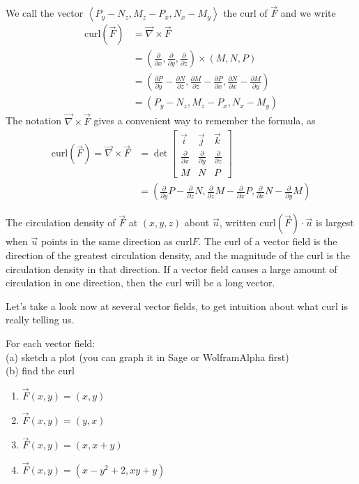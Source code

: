 We call the vector $\left<P_y-N_z,M_z-P_x,N_x-M_y\right>$ the curl of $\vec F$ and we write 
\begin{align*}
\text{curl}(\vec F) 
&= \vec \nabla \times \vec F \\
&= \left(\frac{\partial}{\partial x},\frac{\partial}{\partial y},\frac{\partial}{\partial z}\right) \times (M,N,P) \\
&= \left(\frac{\partial P}{\partial y}-\frac{\partial N}{\partial z}, \frac{\partial M}{\partial z}-\frac{\partial P}{\partial x},\frac{\partial N}{\partial x}-\frac{\partial M}{\partial y}\right) \\
&=  \left(P_y-N_z,M_z-P_x,N_x-M_y\right) 
\end{align*}
  The notation $\vec \nabla \times \vec F $ gives a convenient way to remember the formula, as 
\begin{align*}
\text{curl}(\vec F)=\vec \nabla \times \vec F 
&=\det \begin{bmatrix}
\vec i & \vec j & \vec k\\
\frac{\partial}{\partial x}&\frac{\partial}{\partial y}&\frac{\partial}{\partial z}\\
M&N&P
\end{bmatrix} 
\\&= \left(\frac{\partial}{\partial y}P-\frac{\partial}{\partial z}N,\frac{\partial}{\partial z}M-\frac{\partial}{\partial x}P,\frac{\partial}{\partial x}N-\frac{\partial}{\partial y}M\right)
\end{align*}
\begin{theorem}
The circulation density of $\vec F$ at $(x,y,z)$ about $\vec u$, written $\text{curl}(\vec F)\cdot \vec u$ is largest when $\vec u$ points in the same direction as $\text{curl} F$. The curl of a vector field is the direction of the greatest circulation density, and the magnitude of the curl is the circulation density in that direction. If a vector field causes a large amount of circulation in one direction, then the curl will be a long vector.
\end{theorem}

Let's take a look now at several vector fields, to get intuition about what curl is really telling us.
\begin{problem}\label{2dcurl}
For each vector field: \\
(a) sketch a plot (you can graph it in Sage or WolframAlpha first)\\
(b) find the curl\\  
\begin{enumerate}
\item $\vec{F}(x,y)=(x,y)$
\item $\vec{F}(x,y)=(y,x)$
\item $\vec{F}(x,y)=(x,x+y)$
\item $\vec{F}(x,y)=(x-y^2+2, xy+y)$
\end{enumerate}
\end{problem}

